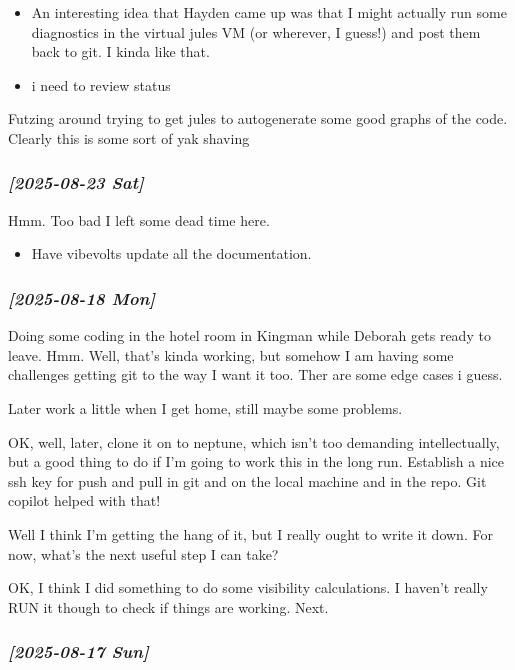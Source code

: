 \documentclass[11pt]{article}
\begin{document}
\begin{itemize}
\item An interesting idea that Hayden came up was that I might actually run some diagnostics
in the virtual jules VM (or wherever, I guess!) and post them back to git.  I kinda like that.
\item i need to review status
\end{itemize}

Futzing around trying to get jules to autogenerate some good graphs of the code.
Clearly this is some sort of yak shaving

\subsubsection{\textit{[2025-08-23 Sat]}}
\label{sec:org91296eb}
Hmm.  Too bad I left some dead time here.

\begin{itemize}
\item Have vibevolts update all the documentation.
\end{itemize}

\subsubsection{\textit{[2025-08-18 Mon]}}
\label{sec:orgc95036c}
Doing some coding in the hotel room in Kingman while Deborah gets ready to leave.
Hmm.
Well, that's kinda working, but somehow I am having some challenges getting git
to the way I want it too. Ther are some edge cases i guess.

Later work a little when I get home, still maybe some problems.

OK, well, later, clone it on to neptune, which isn't too demanding intellectually,
but a good thing to do if I'm going to work this in the long run.
Establish a nice ssh key for push and pull in git and on the local machine
and in the repo.  Git copilot helped with that!

Well I think I'm getting the hang of it, but I really ought to write it down.
For now, what's the next useful step I can take?

OK, I think I did something to do some visibility calculations. I haven't really
RUN it though to check if things are working. Next.

\subsubsection{\textit{[2025-08-17 Sun]}}
\label{sec:orgd8a5fc1}
\end{document}
